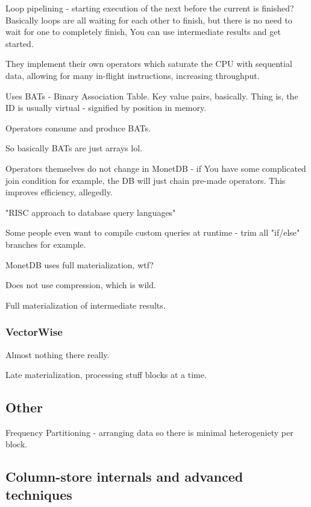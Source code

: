 \documentclass{article}
\begin{document}
			Loop pipelining - starting execution of the next before the current is finished? Basically loops are all waiting for each other to finish, but there is no need to wait for one to completely finish, You can use intermediate results and get started.			
			
			They implement their own operators which saturate the CPU with sequential data, allowing for many in-flight instructions, increasing throughput.
			
			Uses BATs - Binary Association Table. Key value pairs, basically. Thing is, the ID is usually virtual - signified by position in memory.
			
			Operators consume and produce BATs.
			
			So basically BATs are just arrays lol. 
			
			Operators themselves do not change in MonetDB - if You have some complicated join condition for example, the DB will just chain pre-made operators. This improves efficiency, allegedly.
			
			"RISC approach to database query languages"
			
			Some people even want to compile custom queries at runtime - trim all "if/else" branches for example.
			
			MonetDB uses full materialization, wtf?
			
			Does not use compression, which is wild.
			
			Full materialization of intermediate results.
			
		\subsubsection{VectorWise}
		
			Almost nothing there really.
			
			Late materialization, processing stuff blocks at a time.
			
		\subsection{Other}
		
			Frequency Partitioning - arranging data so there is minimal heterogeniety per block.
			
			
			
	\subsection{Column-store internals and advanced techniques}
	
\end{document}

